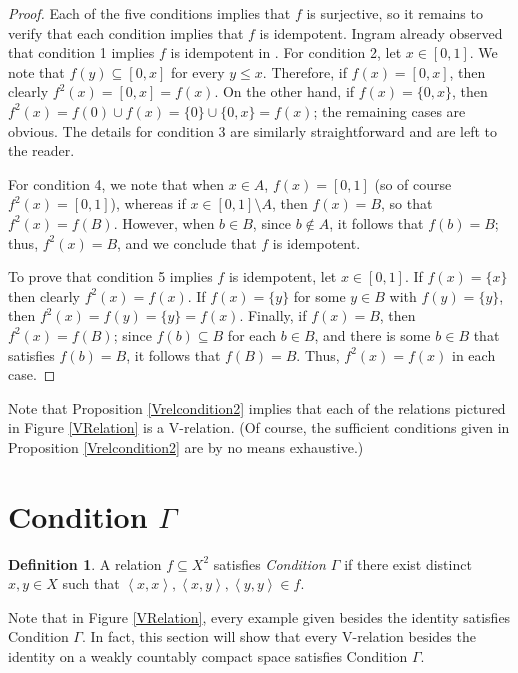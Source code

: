 \documentclass{article}
\newcommand{\term}{\textit}
\newcommand{\tuple}[1]{\left\langle{#1}\right\rangle}
\theoremstyle{plain}
\theoremstyle{definition}
\newtheorem{definition}[theorem]{Definition}
\theoremstyle{remark}
\begin{document}
\begin{proof}
Each of the five conditions implies that $f$ is surjective, so it remains to verify that each condition implies that $f$ is idempotent.  Ingram already observed that condition 1 implies $f$ is idempotent in \cite{Ingrambook}. For condition 2, let $x \in [0,1]$. We note that $f(y)\subseteq [0,x]$ for every $y \le x$. Therefore, if $f(x)= [0,x]$, then clearly $f^2(x)= [0,x]=f(x)$. On the other hand, if $f(x) = \{0,x\}$, then $f^2(x)=f(0) \cup f(x) = \{0\} \cup \{0,x\}=f(x)$; the remaining cases are obvious. The details for condition 3 are similarly straightforward and are left to the reader.

For condition 4, we note that when $x \in A$, $f(x)=[0,1]$ (so of course $f^2(x)=[0,1]$), whereas if $x \in [0,1] \setminus A$, then $f(x)=B$, so that $f^2(x)=f(B)$. However, when $b \in B$, since $b \not\in A$, it follows that $f(b)=B$; thus, $f^2(x)=B$, and we conclude that $f$ is idempotent.

To prove that condition 5 implies $f$ is idempotent, let $x \in [0,1]$. If $f(x)=\{x\}$ then clearly $f^2(x)=f(x)$. If $f(x)=\{y\}$ for some $y \in B$ with $f(y)=\{y\}$, then $f^2(x)=f(y)=\{y\}=f(x)$. Finally, if $f(x)=B$, then $f^2(x)=f(B)$; since $f(b) \subseteq B$ for each $b \in B$, and there is some $b \in B$ that satisfies $f(b)=B$, it follows that $f(B)=B$. Thus, $f^2(x)=f(x)$ in each case.
\end{proof}

Note that Proposition \ref{Vrelcondition2} implies that each of the relations pictured in Figure \ref{VRelation}  is a V-relation. (Of course, the sufficient conditions given in Proposition \ref{Vrelcondition2} are by no means exhaustive.)

\section{
Condition \texorpdfstring{\(\Gamma\)}{Gamma}
}\label{conditionGamma}

\begin{definition}
  A relation \(f \subseteq X^2\) satisfies \term{Condition \(\Gamma\)} if there 
  exist distinct \(x, y \in X\) such that \(\tuple{x,x},\tuple{x,y},\tuple{y,y}\in f\).
\end{definition}

Note that in Figure \ref{VRelation}, every example given besides the
identity satisfies Condition \(\Gamma\).
In fact, this section will show that every V-relation besides the identity on a 
weakly countably compact space satisfies Condition \(\Gamma\).
\end{document}
